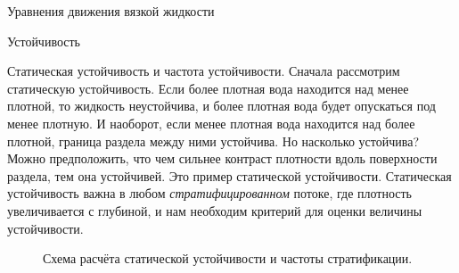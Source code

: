 \begin{chapter}{Уравнения движения вязкой жидкости}
\begin{section}{Устойчивость}
\begin{paragraph}{Статическая устойчивость и частота устойчивости.}
Сначала рассмотрим статическую устойчивость. Если более плотная вода
находится над менее плотной, то жидкость неустойчива, и более плотная
вода будет опускаться под менее плотную. И наоборот, если менее
плотная вода находится над более плотной, граница раздела между ними
устойчива. Но насколько устойчива? Можно предположить, что чем сильнее
контраст плотности вдоль поверхности раздела, тем она устойчивей. Это
пример статической устойчивости. Статическая устойчивость важна в
любом \emph{стратифицированном} потоке, где плотность увеличивается с
глубиной, и нам необходим критерий для оценки величины
устойчивости.
%

\begin{figure}[b!]
\caption{Схема расчёта статической устойчивости и частоты стратификации.}
\label{fig:stabilitysketch}
\end{figure}
%
%


\end{paragraph}
\end{section}
\end{chapter}
